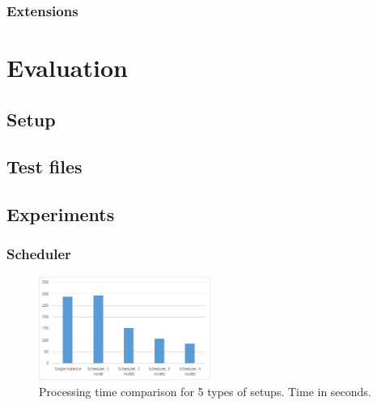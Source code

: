 \documentclass{acm_proc_article-sp}
\begin{document}
\subsubsection{Extensions}

\section{Evaluation}
\label{sec_eval}

\subsection{Setup}

\subsection{Test files}

\subsection{Experiments}

\subsubsection{Scheduler}
\begin{figure}[]
	\centering
	\includegraphics[width=0.5\textwidth]{images/diagram_total_processing.jpg}
	\caption{Processing time comparison for 5 types of setups. Time in seconds.}
	\label{fig:diagram_total_processing}
\end{figure}
\end{document}
